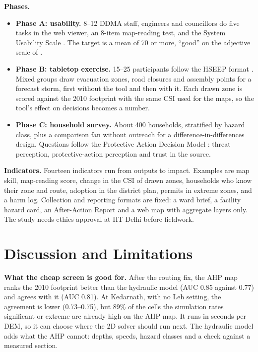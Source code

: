 \documentclass[sigconf,nonacm]{acmart}
\begin{document}
\textbf{Phases.}
\begin{itemize}
  \item \textbf{Phase A: usability.} 8--12 DDMA staff, engineers and councillors do five tasks in the web viewer, an 8-item map-reading test, and the System Usability Scale \cite{brooke1996}. The target is a mean of 70 or more, ``good'' on the adjective scale of \cite{bangor2009}.
  \item \textbf{Phase B: tabletop exercise.} 15--25 participants follow the HSEEP format \cite{hseep2020}. Mixed groups draw evacuation zones, road closures and assembly points for a forecast storm, first without the tool and then with it. Each drawn zone is scored against the 2010 footprint with the same CSI used for the maps, so the tool's effect on decisions becomes a number.
  \item \textbf{Phase C: household survey.} About 400 households, stratified by hazard class, plus a comparison fan without outreach for a difference-in-differences design. Questions follow the Protective Action Decision Model \cite{lindell2012}: threat perception, protective-action perception and trust in the source.
\end{itemize}

\textbf{Indicators.} Fourteen indicators run from outputs to impact. Examples are map skill, map-reading score, change in the CSI of drawn zones, households who know their zone and route, adoption in the district plan, permits in extreme zones, and a harm log. Collection and reporting formats are fixed: a ward brief, a facility hazard card, an After-Action Report and a web map with aggregate layers only. The study needs ethics approval at IIT Delhi before fieldwork.

\section{Discussion and Limitations}\label{sec:limits}
\textbf{What the cheap screen is good for.} After the routing fix, the AHP map ranks the 2010 footprint better than the hydraulic model (AUC 0.85 against 0.77) and agrees with it (AUC 0.81). At Kedarnath, with no Leh setting, the agreement is lower (0.73--0.75), but 89\% of the cells the simulation rates significant or extreme are already high on the AHP map. It runs in seconds per DEM, so it can choose where the 2D solver should run next. The hydraulic model adds what the AHP cannot: depths, speeds, hazard classes and a check against a measured section.
\end{document}
